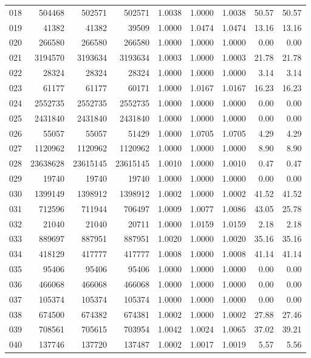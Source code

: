 \begin{longtable}{crrrrrrrr}
018 & 504468 & 502571 & 502571 & 1.0038 & 1.0000 & 1.0038 & 50.57 & 50.57 \\
019 & 41382 & 41382 & 39509 & 1.0000 & 1.0474 & 1.0474 & 13.16 & 13.16 \\
020 & 266580 & 266580 & 266580 & 1.0000 & 1.0000 & 1.0000 & 0.00 & 0.00 \\
021 & 3194570 & 3193634 & 3193634 & 1.0003 & 1.0000 & 1.0003 & 21.78 & 21.78 \\
022 & 28324 & 28324 & 28324 & 1.0000 & 1.0000 & 1.0000 & 3.14 & 3.14 \\
023 & 61177 & 61177 & 60171 & 1.0000 & 1.0167 & 1.0167 & 16.23 & 16.23 \\
024 & 2552735 & 2552735 & 2552735 & 1.0000 & 1.0000 & 1.0000 & 0.00 & 0.00 \\
025 & 2431840 & 2431840 & 2431840 & 1.0000 & 1.0000 & 1.0000 & 0.00 & 0.00 \\
026 & 55057 & 55057 & 51429 & 1.0000 & 1.0705 & 1.0705 & 4.29 & 4.29 \\
027 & 1120962 & 1120962 & 1120962 & 1.0000 & 1.0000 & 1.0000 & 8.90 & 8.90 \\
028 & 23638628 & 23615145 & 23615145 & 1.0010 & 1.0000 & 1.0010 & 0.47 & 0.47 \\
029 & 19740 & 19740 & 19740 & 1.0000 & 1.0000 & 1.0000 & 0.00 & 0.00 \\
030 & 1399149 & 1398912 & 1398912 & 1.0002 & 1.0000 & 1.0002 & 41.52 & 41.52 \\
031 & 712596 & 711944 & 706497 & 1.0009 & 1.0077 & 1.0086 & 43.05 & 25.78 \\
032 & 21040 & 21040 & 20711 & 1.0000 & 1.0159 & 1.0159 & 2.18 & 2.18 \\
033 & 889697 & 887951 & 887951 & 1.0020 & 1.0000 & 1.0020 & 35.16 & 35.16 \\
034 & 418129 & 417777 & 417777 & 1.0008 & 1.0000 & 1.0008 & 41.14 & 41.14 \\
035 & 95406 & 95406 & 95406 & 1.0000 & 1.0000 & 1.0000 & 0.00 & 0.00 \\
036 & 466068 & 466068 & 466068 & 1.0000 & 1.0000 & 1.0000 & 0.00 & 0.00 \\
037 & 105374 & 105374 & 105374 & 1.0000 & 1.0000 & 1.0000 & 0.00 & 0.00 \\
038 & 674500 & 674382 & 674381 & 1.0002 & 1.0000 & 1.0002 & 27.88 & 27.46 \\
039 & 708561 & 705615 & 703954 & 1.0042 & 1.0024 & 1.0065 & 37.02 & 39.21 \\
040 & 137746 & 137720 & 137487 & 1.0002 & 1.0017 & 1.0019 & 5.57 & 5.56 \\

\end{longtable}
